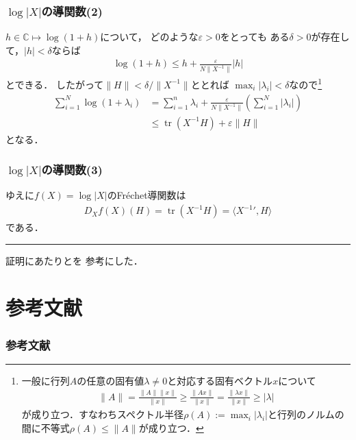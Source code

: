 \documentclass[10pt,hyperref={unicode}]{beamer}
\DeclareMathOperator*{\tr}{tr}
\begin{document}
\begin{frame}
    \frametitle{$\log |X|$の導関数(2)}
    $h \in \mathbb{C} \mapsto \log (1 + h)$について，
    どのような$\varepsilon > 0$をとっても
    ある$\delta > 0$が存在して，$|h| < \delta$ならば
    \begin{align*}
        \log (1 + h) \leq h + \frac{\varepsilon}{N\|X^{-1}\|} |h|
    \end{align*}
    とできる．
    したがって$\|H\| < \delta /\|X^{-1}\|$ととれば
    $\max_i |\lambda_i| < \delta$なので\footnote[frame]{一般に行列$A$の任意の固有値$\lambda \neq 0$と対応する固有ベクトル$x$について
    \begin{align*}
        \|A\| = \frac{\|A\|\|x\|}{\|x\|} \geq \frac{\|Ax\|}{\|x\|} = \frac{\|\lambda x\|}{\|x\|} \geq |\lambda|
    \end{align*}
    が成り立つ．すなわちスペクトル半径$\rho(A) := \max_i |\lambda_i|$と行列のノルムの間に不等式$\rho(A) \leq \|A\|$が成り立つ．}
    \begin{align*}
        \sum_{i = 1}^N \log (1 + \lambda_i) &= \sum_{i = 1}^n \lambda_i + \frac{\varepsilon}{N\|X^{-1}\|} \left(\sum_{i = 1}^N |\lambda_i|\right) \\
                                            &\leq \tr (X^{-1}H) + \varepsilon \|H\|
    \end{align*}
    となる．
\end{frame}

\begin{frame}
    \frametitle{$\log |X|$の導関数(3)}
    ゆえに$f(X) = \log |X|$のFréchet導関数は
    \begin{align*}
        D_{X}f(X)(H) = \tr(X^{-1}H) = \langle X^{-1}{}',H\rangle
    \end{align*}
    である．\hfill\rule{5pt}{10pt}

    \bigskip

    証明にあたり\cite{mantonsblog}と\cite{manton2012}を
    参考にした．
\end{frame}

\section{参考文献}
\begin{frame}
    \frametitle{参考文献}
    
    
\end{frame}
\end{document}
